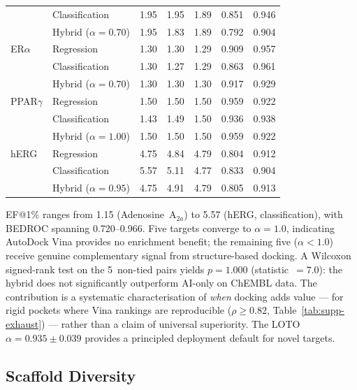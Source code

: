\documentclass[conference]{IEEEtran}
\begin{document}
\begin{table}[!t]
{\begin{tabular}{p{3cm} p{3cm}  p{3cm} p{3cm} p{3cm}  p{3cm} p{3cm}}
 & Classification & 1.95 & 1.95 & 1.89 & 0.851 & 0.946 \\
 & Hybrid ($\alpha{=}0.70$) & 1.95 & 1.83 & 1.89 & 0.792 & 0.904 \\
\midrule
ER$\alpha$ & Regression & 1.30 & 1.30 & 1.29 & 0.909 & 0.957 \\
 & Classification & 1.30 & 1.27 & 1.29 & 0.863 & 0.961 \\
 & Hybrid ($\alpha{=}0.70$) & 1.30 & 1.30 & 1.30 & 0.917 & 0.929 \\
\midrule
PPAR$\gamma$ & Regression & 1.50 & 1.50 & 1.50 & 0.959 & 0.922 \\
 & Classification & 1.43 & 1.49 & 1.50 & 0.936 & 0.938 \\
 & Hybrid ($\alpha{=}1.00$) & 1.50 & 1.50 & 1.50 & 0.959 & 0.922 \\
\midrule
hERG & Regression & 4.75 & 4.84 & 4.79 & 0.804 & 0.912 \\
 & Classification & 5.57 & 5.11 & 4.77 & 0.833 & 0.904 \\
 & Hybrid ($\alpha{=}0.95$) & 4.75 & 4.91 & 4.79 & 0.805 & 0.913 \\
\bottomrule
\end{tabular}}
\end{table}



EF@1\% ranges from 1.15 (Adenosine~A$_{2a}$) to 5.57
(hERG, classification), with BEDROC spanning 0.720--0.966.
Five targets converge to $\alpha{=}1.0$, indicating
AutoDock Vina provides no enrichment benefit; the
remaining five ($\alpha{<}1.0$) receive genuine
complementary signal from structure-based docking.
A Wilcoxon signed-rank test on the 5~non-tied pairs
yields $p{=}1.000$ (statistic~$=7.0$): the hybrid does
not significantly outperform AI-only on ChEMBL data.
The contribution is a systematic characterisation of
\emph{when} docking adds value --- for rigid pockets
where Vina rankings are reproducible
($\rho{\geq}0.82$, Table~\ref{tab:supp-exhaust}) ---
rather than a claim of universal superiority.
The LOTO $\alpha{=}0.935{\pm}0.039$ provides a principled
deployment default for novel targets.


\subsection{\textbf{Scaffold Diversity}}
\label{sec:scaffold-results}
\end{document}
